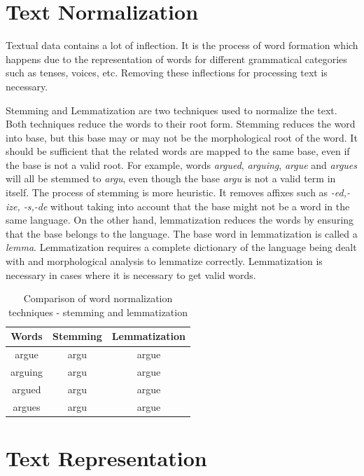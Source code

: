 \section{Text Normalization}
Textual data contains a lot of inflection. It is the process of word formation which happens due to the representation of words for different grammatical categories such as tenses, voices, etc. Removing these inflections for processing text is necessary.

Stemming and Lemmatization are two techniques used to normalize the text. Both techniques reduce the words to their root form. Stemming reduces the word into base, but this base may or may not be the morphological root of the word. It should be sufficient that the related words are mapped to the same base, even if the base is not a valid root. For example, words \textit{argued}, \textit{arguing}, \textit{argue} and \textit{argues} will all be stemmed to \textit{argu}, even though the base \textit{argu} is not a valid term in itself. The process of stemming is more heuristic. It removes affixes such as \textit{-ed,-ize, -s,-de} without taking into account that the base might not be a word in the same language. On the other hand, lemmatization reduces the words by ensuring that the base belongs to the language. The base word in lemmatization is called a \textit{lemma}. Lemmatization requires a complete dictionary of the language being dealt with and morphological analysis to lemmatize correctly. Lemmatization is necessary in cases where it is necessary to get valid words. 
\begin{table}[!ht]
\centering
\begin{tabular}{ccc}
\hline
\textbf{Words} & \textbf{Stemming} & \textbf{Lemmatization} \\ \hline
argue & argu & argue \\ 
arguing & argu & argue \\ 
argued & argu & argue \\ 
argues & argu & argue \\ \hline
\end{tabular}
\captionsetup{justification=centering,margin=1cm}
\caption{Comparison of word normalization techniques - stemming and lemmatization}
\label{table:StemVSLemma}
\end{table}


\section{Text Representation}\label{backgroundTextRepresentation}

